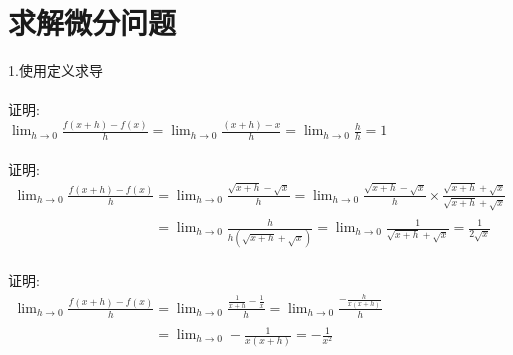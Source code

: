 \chapter{求解微分问题}
1.使用定义求导\\
\\
证明:\\
$\displaystyle\lim_{h\to 0}\frac{f(x+h)-f(x)}{h}=\lim_{h\to 0}\frac{(x+h)-x}{h}=\lim_{h\to 0}\frac{h}{h}=1$\\[4ex]

\\
证明:\\
\begin{math}
\begin{array}{l}
\displaystyle\lim_{h\to 0}\frac{f(x+h)-f(x)}{h}=\lim_{h\to 0}\frac{\sqrt{x+h}-\sqrt{x}}{h}=\lim_{h\to 0}\frac{\sqrt{x+h}-\sqrt{x}}{h}\times\frac{\sqrt{x+h}+\sqrt{x}}{\sqrt{x+h}+\sqrt{x}}\\
\displaystyle\phantom{\lim_{h\to 0}\frac{f(x+h)-f(x)}{h}}=\lim_{h\to 0}\frac{h}{h(\sqrt{x+h}+\sqrt{x})}=\lim_{h\to 0}\frac{1}{\sqrt{x+h}+\sqrt{x}}=\frac{1}{2\sqrt{x}}
\end{array}
\end{math}\\[4ex]

\\
证明:\\
\begin{math}
\begin{array}{l}
\displaystyle\lim_{h\to 0}\frac{f(x+h)-f(x)}{h}=\lim_{h\to 0}\frac{\frac{1}{x+h}-\frac{1}{x}}{h}=\lim_{h\to 0}\frac{-\frac{h}{x(x+h)}}{h}\\
\displaystyle\phantom{\lim_{h\to 0}\frac{f(x+h)-f(x)}{h}}=\lim_{h\to 0}-\frac{1}{x(x+h)}=-\frac{1}{x^2}
\end{array}
\end{math}\\[4ex]

\\[4ex]

